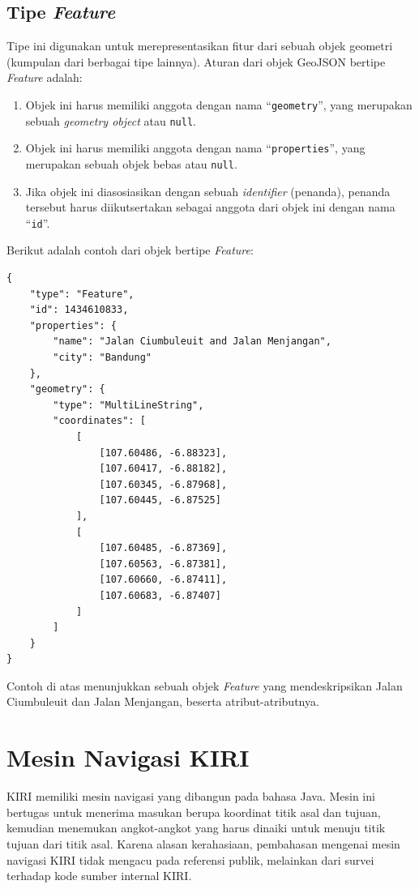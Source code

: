 \subsection{Tipe \textit{Feature}}

Tipe ini digunakan untuk merepresentasikan fitur dari sebuah objek geometri (kumpulan dari berbagai tipe lainnya). Aturan dari objek GeoJSON bertipe \textit{Feature} adalah:

\begin{enumerate}
	\item Objek ini harus memiliki anggota dengan nama ``\texttt{geometry}'', yang merupakan sebuah \textit{geometry object} atau \texttt{null}.
	\item Objek ini harus memiliki anggota dengan nama ``\texttt{properties}'', yang merupakan sebuah objek bebas atau \texttt{null}.
	\item Jika objek ini diasosiasikan dengan sebuah \textit{identifier} (penanda), penanda tersebut harus diikutsertakan sebagai anggota dari objek ini dengan nama ``\texttt{id}''.
\end{enumerate}

Berikut adalah contoh dari objek bertipe \textit{Feature}:

\begin{lstlisting}
{
	"type": "Feature",
	"id": 1434610833,
	"properties": {
		"name": "Jalan Ciumbuleuit and Jalan Menjangan",
		"city": "Bandung"
	},
	"geometry": {
		"type": "MultiLineString",
		"coordinates": [
			[
				[107.60486, -6.88323],
				[107.60417, -6.88182],
				[107.60345, -6.87968],
				[107.60445, -6.87525]
			],
			[
				[107.60485, -6.87369],
				[107.60563, -6.87381],
				[107.60660, -6.87411],
				[107.60683, -6.87407]
			]
		]
	}
}
\end{lstlisting}

Contoh di atas menunjukkan sebuah objek \textit{Feature} yang mendeskripsikan Jalan Ciumbuleuit dan Jalan Menjangan, beserta atribut-atributnya.

\section{Mesin Navigasi KIRI}

KIRI memiliki mesin navigasi yang dibangun pada bahasa Java. Mesin ini bertugas untuk menerima masukan berupa koordinat titik asal dan tujuan, kemudian menemukan angkot-angkot yang harus dinaiki untuk menuju titik tujuan dari titik asal. Karena alasan kerahasiaan, pembahasan mengenai mesin navigasi KIRI tidak mengacu pada referensi publik, melainkan dari survei terhadap kode sumber internal KIRI.

